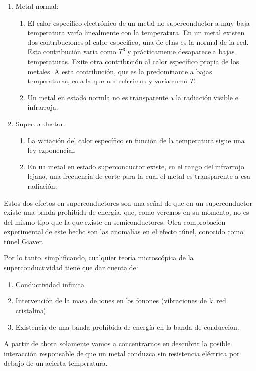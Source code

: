 \begin{enumerate}
\item Metal normal:
\begin{enumerate}
    \item El calor específico electrónico de un metal no superconductor a muy baja temperatura varía linealmente con la temperatura. En un metal existen dos contribuciones al calor específico, una de ellas es la normal de la red. Esta contribución varía como $T^3$ y prácticamente desaparece a bajas temperaturas. Exite otra contribución al calor específico propia de los metales. A esta contribución, que es la predominante a bajas temperaturas, es a la que nos referimos y varía como $T$.
    \item Un metal en estado normla no es transparente a la radiación visible e infrarroja.
\end{enumerate}
\item Superconductor:
\begin{enumerate}
    \item La variación del calor específico en función de la temperatura sigue una ley exponencial.
    \item En un metal en estado superconductor existe, en el rango del infrarrojo lejano, una frecuencia de corte para la cual el metal es transparente a esa radiación.
\end{enumerate}
\end{enumerate}

Estos dos efectos en superconductores son una señal de que en un superconductor existe una banda prohibida de energía, que, como veremos en su momento, no es del mismo tipo que la que existe en semiconductores. Otra comprobación experimental de este hecho son las anomalías en el efecto túnel, conocido como túnel Giaver.

Por lo tanto, simplificando, cualquier teoría microscópica de la superconductividad tiene que dar cuenta de:

\begin{enumerate}
    \item Conductividad infinita.
    \item Intervención de la masa de iones en los fonones (vibraciones de la red cristalina).
    \item Existencia de una banda prohibida de energía en la banda de conduccion.
\end{enumerate}

A partir de ahora solamente vamos a concentrarnos en descubrir la posible interacción responsable de que un metal conduzca sin resistencia eléctrica por debajo de un acierta temperatura.

